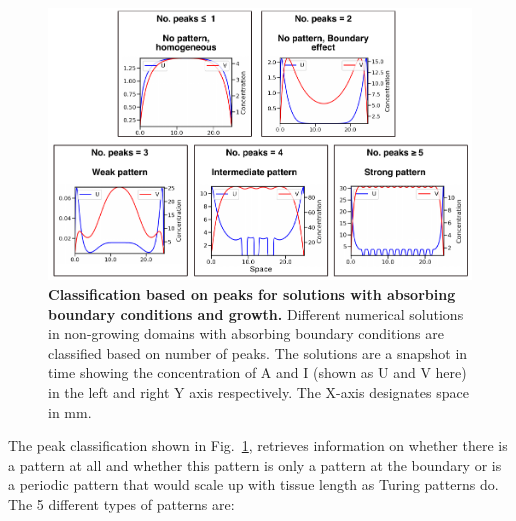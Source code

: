 \begin{figure}[H] %
    \centering
    \begin{adjustbox}{center}
        \includegraphics[width=1\textwidth]{chapters/Chapter 1/peaks_classification} %
    \end{adjustbox}
    \caption{\textbf{Classification based on peaks for solutions with absorbing boundary conditions and growth.} Different numerical solutions in non-growing domains with absorbing boundary conditions are classified based on number of peaks. The solutions are a snapshot in time showing the concentration of A and I (shown as U and V here) in the left and right Y axis respectively. The X-axis designates space in mm.}
    \label{fig:peaks_classification} %
\end{figure}
The peak classification shown in Fig.~\ref{fig:peaks_classification}, retrieves information on whether there is a pattern at all and whether this pattern is only a pattern at the boundary or is a periodic pattern that would scale up with tissue length as Turing patterns do.
The 5 different types of patterns are:
